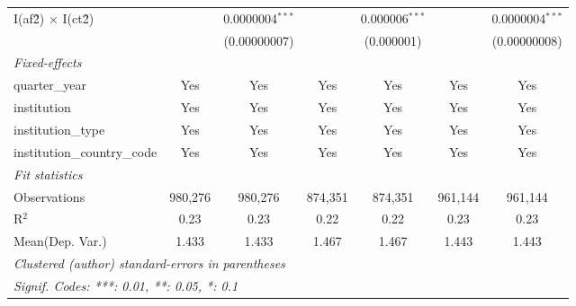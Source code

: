 \begin{tabular}{lcccccc}
   I(af\^2) $\times$ I(ct\^2)         &               & 0.0000004$^{***}$ &               & 0.000006$^{***}$ &               & 0.0000004$^{***}$\\   
                                      &               & (0.00000007)      &               & (0.000001)       &               & (0.00000008)\\   
   \midrule
   \emph{Fixed-effects}\\
   quarter\_year                      & Yes           & Yes               & Yes           & Yes              & Yes           & Yes\\  
   institution                        & Yes           & Yes               & Yes           & Yes              & Yes           & Yes\\  
   institution\_type                  & Yes           & Yes               & Yes           & Yes              & Yes           & Yes\\  
   institution\_country\_code         & Yes           & Yes               & Yes           & Yes              & Yes           & Yes\\  
   \midrule
   \emph{Fit statistics}\\
   Observations                       & 980,276       & 980,276           & 874,351       & 874,351          & 961,144       & 961,144\\  
   R$^2$                              & 0.23          & 0.23              & 0.22          & 0.22             & 0.23          & 0.23\\  
Mean(Dep. Var.) & 1.433 & 1.433 & 1.467 & 1.467 & 1.443 & 1.443 \\
   \midrule \midrule
   \multicolumn{7}{l}{\emph{Clustered (author) standard-errors in parentheses}}\\
   \multicolumn{7}{l}{\emph{Signif. Codes: ***: 0.01, **: 0.05, *: 0.1}}\\
\end{tabular}
\par\endgroup
